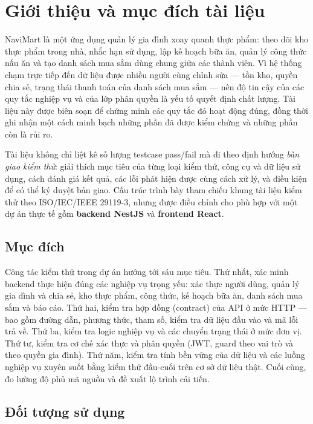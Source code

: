\documentclass[12pt,a4paper]{article}
\begin{document}
\section{Giới thiệu và mục đích tài liệu}

NaviMart là một ứng dụng quản lý gia đình xoay quanh thực phẩm: theo dõi kho thực phẩm trong nhà, nhắc hạn
sử dụng, lập kế hoạch bữa ăn, quản lý công thức nấu ăn và tạo danh sách mua sắm dùng chung giữa các thành
viên. Vì hệ thống chạm trực tiếp đến dữ liệu được nhiều người cùng chỉnh sửa --- tồn kho, quyền chia sẻ,
trạng thái thanh toán của danh sách mua sắm --- nên độ tin cậy của các quy tắc nghiệp vụ và của lớp phân
quyền là yếu tố quyết định chất lượng. Tài liệu này được biên soạn để chứng minh các quy tắc đó hoạt động
đúng, đồng thời ghi nhận một cách minh bạch những phần đã được kiểm chứng và những phần còn là rủi ro.

Tài liệu không chỉ liệt kê số lượng testcase pass/fail mà đi theo định hướng \emph{bàn giao kiểm thử}: giải
thích mục tiêu của từng loại kiểm thử, công cụ và dữ liệu sử dụng, cách đánh giá kết quả, các lỗi phát hiện
được cùng cách xử lý, và điều kiện để có thể ký duyệt bản giao. Cấu trúc trình bày tham chiếu khung tài liệu
kiểm thử theo ISO/IEC/IEEE 29119-3, nhưng được điều chỉnh cho phù hợp với một dự án thực tế gồm
\textbf{backend NestJS} và \textbf{frontend React}.

\subsection{Mục đích}

Công tác kiểm thử trong dự án hướng tới sáu mục tiêu. Thứ nhất, xác minh backend thực hiện đúng các nghiệp
vụ trọng yếu: xác thực người dùng, quản lý gia đình và chia sẻ, kho thực phẩm, công thức, kế hoạch bữa ăn,
danh sách mua sắm và báo cáo. Thứ hai, kiểm tra hợp đồng (contract) của API ở mức HTTP --- bao gồm đường
dẫn, phương thức, tham số, kiểm tra dữ liệu đầu vào và mã lỗi trả về. Thứ ba, kiểm tra logic nghiệp vụ và
các chuyển trạng thái ở mức đơn vị. Thứ tư, kiểm tra cơ chế xác thực và phân quyền (JWT, guard theo vai trò
và theo quyền gia đình). Thứ năm, kiểm tra tính bền vững của dữ liệu và các luồng nghiệp vụ xuyên suốt bằng
kiểm thử đầu-cuối trên cơ sở dữ liệu thật. Cuối cùng, đo lường độ phủ mã nguồn và đề xuất lộ trình cải tiến.

\subsection{Đối tượng sử dụng}
\end{document}
